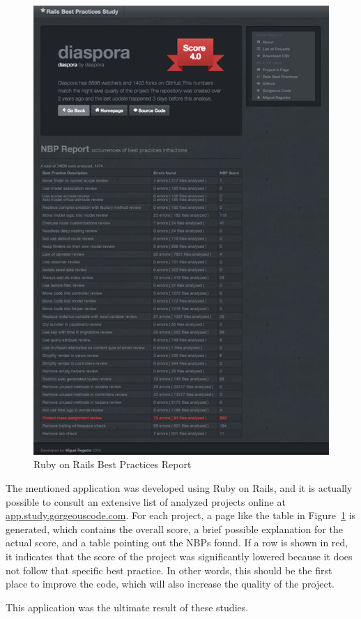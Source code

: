 \begin{figure}[h!]
  \caption{Ruby on Rails Best Practices Report}\label{fig:rbp_s}
  \centering
  \includegraphics[scale=0.75]{Images/rbp_s}
\end{figure}

The mentioned application was developed using Ruby on Rails, and it is actually possible to consult an extensive list of analyzed projects online at \url{app.study.gorgeouscode.com}. For each project, a page like the table in Figure~\ref{fig:rbp_s} is generated, 
which contains the overall score, a brief possible explanation for the actual score, and a table pointing out the 
NBPs found. If a row is shown in red, it indicates that the score of the project was significantly lowered because 
it does not follow that specific best practice. In other words, this should be the first place to improve the code,
which will also increase the quality of the project.

This application was the ultimate result of these studies.












